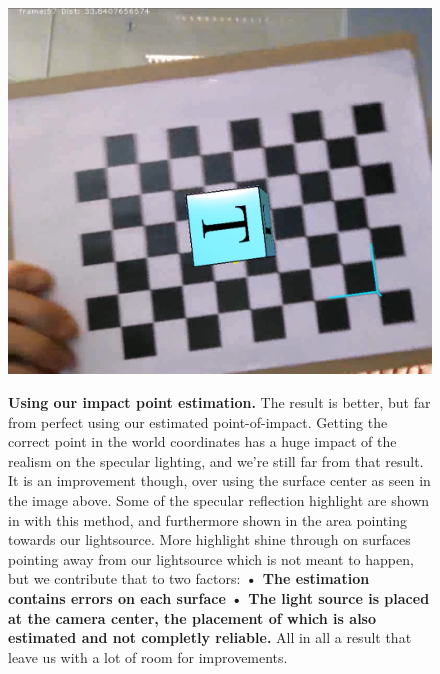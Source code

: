 \begin{figure}[H]
    \includegraphics{pics/EstimatedLight.png}
    \label{fig:EstimatedImpactPoint}
    \caption{\textbf{Using our impact point estimation.}
     The result is better, but far from perfect using our estimated point-of-impact. Getting the correct point in the world coordinates has a huge impact of the realism on the specular lighting, and we're still far from that result. It is an improvement though, over using the surface center as seen in the image above. Some of the specular reflection highlight are shown in with this method, and furthermore shown in the area pointing towards our lightsource. More highlight shine through on surfaces pointing away from our lightsource which is not meant to happen, but we contribute that to two factors:
\textbf{• The estimation contains errors on each surface}
\textbf{• The light source is placed at the camera center, the placement of which is also estimated and not completly reliable.}
All in all a result that leave us with a lot of room for improvements.}
\end{figure}



